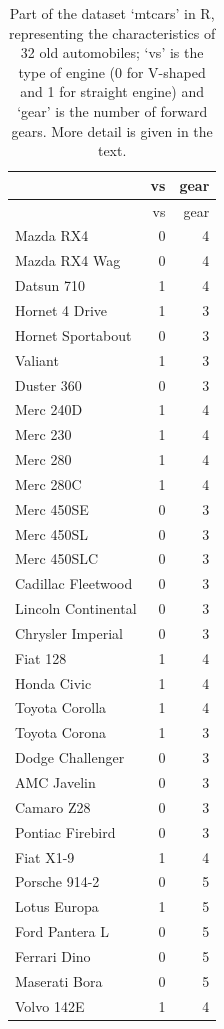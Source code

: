 \documentclass[
  letterpaper,
  DIV=11,
  numbers=noendperiod]{scrreprt}
\begin{document}
\begin{longtable}[]{@{}lrr@{}}
\caption{Part of the dataset `mtcars' in R, representing the
characteristics of 32 old automobiles; `vs' is the type of engine (0 for
V-shaped and 1 for straight engine) and `gear' is the number of forward
gears. More detail is given in the text.}\tabularnewline
\toprule\noalign{}
& vs & gear \\
\midrule\noalign{}
\endfirsthead
\toprule\noalign{}
& vs & gear \\
\midrule\noalign{}
\endhead
\bottomrule\noalign{}
\endlastfoot
Mazda RX4 & 0 & 4 \\
Mazda RX4 Wag & 0 & 4 \\
Datsun 710 & 1 & 4 \\
Hornet 4 Drive & 1 & 3 \\
Hornet Sportabout & 0 & 3 \\
Valiant & 1 & 3 \\
Duster 360 & 0 & 3 \\
Merc 240D & 1 & 4 \\
Merc 230 & 1 & 4 \\
Merc 280 & 1 & 4 \\
Merc 280C & 1 & 4 \\
Merc 450SE & 0 & 3 \\
Merc 450SL & 0 & 3 \\
Merc 450SLC & 0 & 3 \\
Cadillac Fleetwood & 0 & 3 \\
Lincoln Continental & 0 & 3 \\
Chrysler Imperial & 0 & 3 \\
Fiat 128 & 1 & 4 \\
Honda Civic & 1 & 4 \\
Toyota Corolla & 1 & 4 \\
Toyota Corona & 1 & 3 \\
Dodge Challenger & 0 & 3 \\
AMC Javelin & 0 & 3 \\
Camaro Z28 & 0 & 3 \\
Pontiac Firebird & 0 & 3 \\
Fiat X1-9 & 1 & 4 \\
Porsche 914-2 & 0 & 5 \\
Lotus Europa & 1 & 5 \\
Ford Pantera L & 0 & 5 \\
Ferrari Dino & 0 & 5 \\
Maserati Bora & 0 & 5 \\
Volvo 142E & 1 & 4 \\
\end{longtable}
\end{document}
